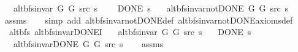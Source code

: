 \begin{isabellebody}
\ \ \ {\isachardoublequoteopen}alt{\isacharunderscore}{\kern0pt}bfs{\isacharunderscore}{\kern0pt}invar{\isacharprime}{\kern0pt}\ G{}\ G{}\ src\ s{\isachardoublequoteclose}\isanewline
\ \ \ {\isachardoublequoteopen}{\isasymnot}\ DONE\ s{\isachardoublequoteclose}\isanewline
\ \ \ {\isachardoublequoteopen}alt{\isacharunderscore}{\kern0pt}bfs{\isacharunderscore}{\kern0pt}invar{\isacharunderscore}{\kern0pt}not{\isacharunderscore}{\kern0pt}DONE{\isacharprime}{\kern0pt}\ G{}\ G{}\ src\ s{\isachardoublequoteclose}%
\endisataginvisible
{\isafoldinvisible}%
%
\isadeliminvisible
\isanewline
%
\endisadeliminvisible
%
\isadelimproof
\ \ %
\endisadelimproof
%
\isatagproof
{}\isamarkupfalse%
\ assms\isanewline
\ \ \isamarkupfalse%
\ {\isacharparenleft}{\kern0pt}simp\ add{\isacharcolon}{\kern0pt}\ alt{\isacharunderscore}{\kern0pt}bfs{\isacharunderscore}{\kern0pt}invar{\isacharunderscore}{\kern0pt}not{\isacharunderscore}{\kern0pt}DONE{\isacharunderscore}{\kern0pt}def\ alt{\isacharunderscore}{\kern0pt}bfs{\isacharunderscore}{\kern0pt}invar{\isacharunderscore}{\kern0pt}not{\isacharunderscore}{\kern0pt}DONE{\isacharunderscore}{\kern0pt}axioms{\isacharunderscore}{\kern0pt}def{\isacharparenright}{\kern0pt}%
\endisatagproof
{\isafoldproof}%
%
\isadelimproof
\isanewline
%
\endisadelimproof
%
\isadeliminvisible
\isanewline
%
\endisadeliminvisible
%
\isataginvisible
{}\isamarkupfalse%
\ {\isacharparenleft}{\kern0pt}\ alt{\isacharunderscore}{\kern0pt}bfs{\isacharparenright}{\kern0pt}\ alt{\isacharunderscore}{\kern0pt}bfs{\isacharunderscore}{\kern0pt}invar{\isacharunderscore}{\kern0pt}DONE{\isacharprime}{\kern0pt}I{\isacharcolon}{\kern0pt}\isanewline
\ \ \ {\isachardoublequoteopen}alt{\isacharunderscore}{\kern0pt}bfs{\isacharunderscore}{\kern0pt}invar{\isacharprime}{\kern0pt}\ G{}\ G{}\ src\ s{\isachardoublequoteclose}\isanewline
\ \ \ {\isachardoublequoteopen}DONE\ s{\isachardoublequoteclose}\isanewline
\ \ \ {\isachardoublequoteopen}alt{\isacharunderscore}{\kern0pt}bfs{\isacharunderscore}{\kern0pt}invar{\isacharunderscore}{\kern0pt}DONE{\isacharprime}{\kern0pt}\ G{}\ G{}\ src\ s{\isachardoublequoteclose}%
\endisataginvisible
{\isafoldinvisible}%
%
\isadeliminvisible
\isanewline
%
\endisadeliminvisible
%
\isadelimproof
\ \ %
\endisadelimproof
%
\isatagproof
{}\isamarkupfalse%
\ assms\isanewline
\ \ \isamarkupfalse%

\end{isabellebody}
